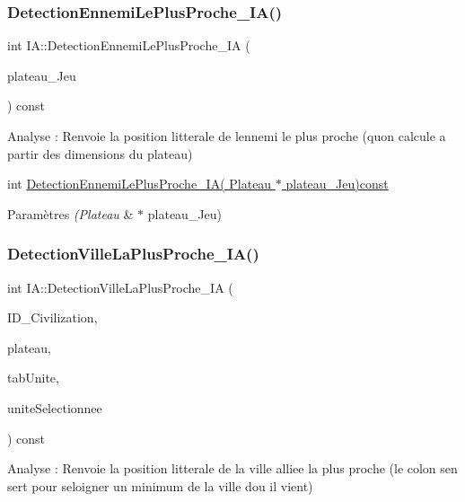 \subsubsection{\texorpdfstring{Detection\+Ennemi\+Le\+Plus\+Proche\+\_\+\+I\+A()}{DetectionEnnemiLePlusProche\_IA()}}
{\footnotesize\ttfamily int I\+A\+::\+Detection\+Ennemi\+Le\+Plus\+Proche\+\_\+\+IA (\begin{DoxyParamCaption}\item[{\hyperlink{classPlateau}{Plateau} $\ast$}]{plateau\+\_\+\+Jeu }\end{DoxyParamCaption}) const}



Analyse \+: Renvoie la position litterale de l\textquotesingle{}ennemi le plus proche (qu\textquotesingle{}on calcule a partir des dimensions du plateau) 

int \hyperlink{classIA_a4085c538669bc85766eaff6bb0597539}{Detection\+Ennemi\+Le\+Plus\+Proche\+\_\+\+I\+A( Plateau $\ast$ plateau\+\_\+\+Jeu)const} 
\begin{DoxyParams}{Paramètres}
{\em (\+Plateau} & $\ast$ plateau\+\_\+\+Jeu) \\
\hline
\end{DoxyParams}
\mbox{\label{classIA_a520de200c4a27aaeb8a225291f7f3c78}} 
\subsubsection{\texorpdfstring{Detection\+Ville\+La\+Plus\+Proche\+\_\+\+I\+A()}{DetectionVilleLaPlusProche\_IA()}}
{\footnotesize\ttfamily int I\+A\+::\+Detection\+Ville\+La\+Plus\+Proche\+\_\+\+IA (\begin{DoxyParamCaption}\item[{int}]{I\+D\+\_\+\+Civilization,  }\item[{\hyperlink{classPlateau}{Plateau} $\ast$}]{plateau,  }\item[{const \hyperlink{classTableauDynamique}{Tableau\+Dynamique} \&}]{tab\+Unite,  }\item[{int}]{unite\+Selectionnee }\end{DoxyParamCaption}) const}



Analyse \+: Renvoie la position litterale de la ville alliee la plus proche (le colon s\textquotesingle{}en sert pour s\textquotesingle{}eloigner un minimum de la ville d\textquotesingle{}ou il vient) 

